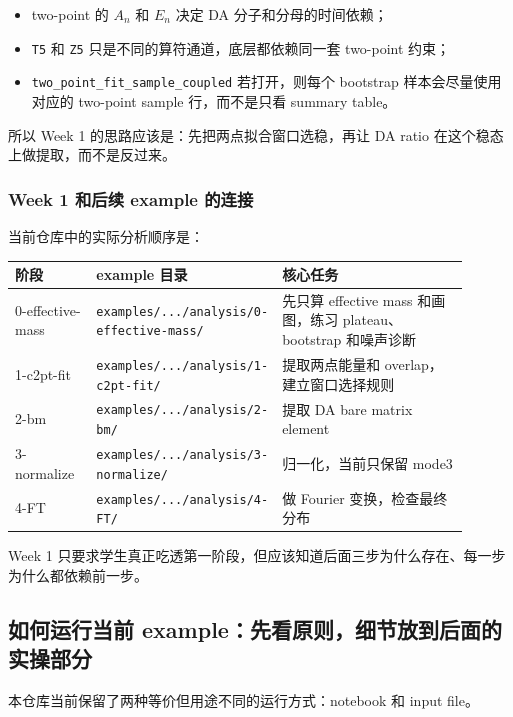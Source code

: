 \documentclass[11pt,a4paper,fontset=fandol]{ctexart}
\begin{document}
\begin{itemize}[leftmargin=2em]
  \item two-point 的 $A_n$ 和 $E_n$ 决定 DA 分子和分母的时间依赖；
  \item \lstinline|T5| 和 \lstinline|Z5| 只是不同的算符通道，底层都依赖同一套 two-point 约束；
  \item \lstinline|two_point_fit_sample_coupled| 若打开，则每个 bootstrap 样本会尽量使用对应的 two-point sample 行，而不是只看 summary table。
\end{itemize}

所以 Week 1 的思路应该是：先把两点拟合窗口选稳，再让 DA ratio 在这个稳态上做提取，而不是反过来。

\subsubsection{Week 1 和后续 example 的连接}

当前仓库中的实际分析顺序是：

\begin{center}
\begin{tabular}{p{0.18\linewidth}p{0.30\linewidth}p{0.42\linewidth}}
\toprule
阶段 & example 目录 & 核心任务 \\
\midrule
0-effective-mass & \lstinline|examples/.../analysis/0-effective-mass/| & 先只算 effective mass 和画图，练习 plateau、bootstrap 和噪声诊断 \\
1-c2pt-fit & \lstinline|examples/.../analysis/1-c2pt-fit/| & 提取两点能量和 overlap，建立窗口选择规则 \\
2-bm & \lstinline|examples/.../analysis/2-bm/| & 提取 DA bare matrix element \\
3-normalize & \lstinline|examples/.../analysis/3-normalize/| & 归一化，当前只保留 mode3 \\
4-FT & \lstinline|examples/.../analysis/4-FT/| & 做 Fourier 变换，检查最终分布 \\
\bottomrule
\end{tabular}
\end{center}

Week 1 只要求学生真正吃透第一阶段，但应该知道后面三步为什么存在、每一步为什么都依赖前一步。

\subsection{如何运行当前 example：先看原则，细节放到后面的实操部分}

本仓库当前保留了两种等价但用途不同的运行方式：notebook 和 input file。
\end{document}
